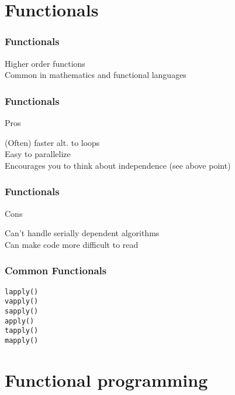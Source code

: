 \documentclass{beamer}
\begin{document}
\section{Functionals}

\begin{frame}
	\frametitle{Functionals}
	\begin{center}
		Higher order functions \\
		Common in mathematics and functional languages\\
	\end{center}
\end{frame}


\begin{frame}
	\frametitle{Functionals}
	\centerline{Pros}
	\begin{center}
		(Often) faster alt. to loops \\
		Easy to parallelize \\
		Encourages you to think about independence (see above point)
	\end{center}
\end{frame}

\begin{frame}
	\frametitle{Functionals}
	\centerline{Cons}
	\begin{center}
		Can't handle serially dependent algorithms \\
		Can make code more difficult to read
	\end{center}
\end{frame}

\begin{frame}
	\frametitle{Common Functionals}
	\begin{center}
		\texttt{lapply()} \\
		\texttt{vapply()} \\
		\texttt{sapply()} \\
		\texttt{apply()} \\
		\texttt{tapply()} \\
		\texttt{mapply()} \\
	\end{center}
\end{frame}

\section{Functional programming}
\end{document}
